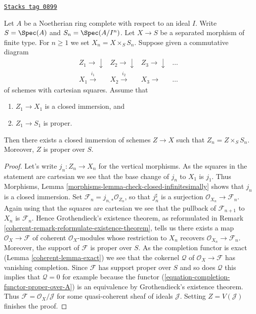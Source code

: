 \begin{lemma}
\label{coherent-lemma-algebraize-formal-closed-subscheme}
\href{https://stacks.math.columbia.edu/tag/0899}{\texttt{Stacks tag 0899}}

Let $A$ be a Noetherian ring complete with respect to an ideal $I$.
Write $S = \Spec(A)$ and $S_n = \Spec(A/I^n)$.
Let $X \to S$ be a separated morphism of finite type.
For $n \geq 1$ we set $X_n = X \times_S S_n$.
Suppose given a commutative diagram
$$
\begin{array}{cccc}Z_1 \longrightarrow\downarrow & Z_2 \longrightarrow\downarrow & Z_3 \longrightarrow\downarrow & \ldots \\ X_1 \overset{i_1}{\longrightarrow} & X_2 \overset{i_2}{\longrightarrow} & X_3 \longrightarrow & \ldots\end{array}
$$
of schemes with cartesian squares. Assume that
\begin{enumerate}
\item $Z_1 \to X_1$ is a closed immersion, and
\item $Z_1 \to S_1$ is proper.
\end{enumerate}
Then there exists a closed immersion of schemes $Z \to X$ such that
$Z_n = Z \times_S S_n$. Moreover, $Z$ is proper over $S$.
\end{lemma}

\begin{proof}

Let's write $j_n : Z_n \to X_n$ for the vertical morphisms.
As the squares in the statement are cartesian
we see that the base change of $j_n$ to $X_1$ is $j_1$.
Thus Morphisms, Lemma \ref{morphisms-lemma-check-closed-infinitesimally}
shows that $j_n$ is a closed immersion.
Set $\mathcal{F}_n = j_{n, *}\mathcal{O}_{Z_n}$, so that
$j_n^\sharp$ is a surjection $\mathcal{O}_{X_n} \to \mathcal{F}_n$.
Again using that the squares are cartesian we see that
the pullback of $\mathcal{F}_{n + 1}$ to $X_n$ is $\mathcal{F}_n$.
Hence Grothendieck's existence theorem, as reformulated in
Remark \ref{coherent-remark-reformulate-existence-theorem},
tells us there exists a map
$\mathcal{O}_X \to \mathcal{F}$
of coherent $\mathcal{O}_X$-modules whose restriction to
$X_n$ recovers $\mathcal{O}_{X_n} \to \mathcal{F}_n$.
Moreover, the support of $\mathcal{F}$ is proper over $S$.
As the completion functor is exact (Lemma \ref{coherent-lemma-exact})
we see that the cokernel $\mathcal{Q}$ of $\mathcal{O}_X \to \mathcal{F}$
has vanishing completion. Since $\mathcal{F}$ has support
proper over $S$ and so does $\mathcal{Q}$ this implies that
$\mathcal{Q} = 0$ for example because the functor
(\ref{equation-completion-functor-proper-over-A}) is an equivalence
by Grothendieck's existence theorem.
Thus $\mathcal{F} = \mathcal{O}_X/\mathcal{J}$
for some quasi-coherent sheaf of ideals $\mathcal{J}$.
Setting $Z = V(\mathcal{J})$ finishes the proof.
\end{proof}

